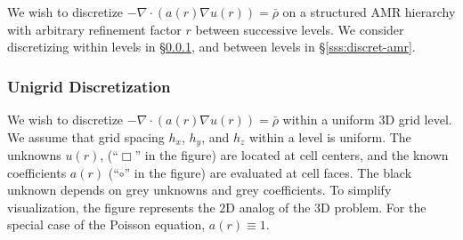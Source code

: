 \documentclass[10pt]{article}
\begin{document}
\newcommand{\indvar}{r}
 \newcommand{\uc}{u(\indvar)}

 \newcommand{\uxp}{u(\indvar+h_x)}
 \newcommand{\uxm}{u(\indvar-h_x)}
 \newcommand{\uxph}{u(\indvar+\frac{h_x}{2})}
 \newcommand{\uxmh}{u(\indvar-\frac{h_x}{2})}

 \newcommand{\uyp}{u(\indvar+h_y)}
 \newcommand{\uym}{u(\indvar-h_y)}
 \newcommand{\uyph}{u(\indvar+\frac{h_y}{2})}
 \newcommand{\uymh}{u(\indvar-\frac{h_y}{2})}

 \newcommand{\uzp}{u(\indvar+h_z)}
 \newcommand{\uzm}{u(\indvar-h_z)}
 \newcommand{\uzph}{u(\indvar+\frac{h_z}{2})}
 \newcommand{\uzmh}{u(\indvar-\frac{h_z}{2})}

 \newcommand{\ac}{a(\indvar)}
 \newcommand{\axph}{a(\indvar+\frac{h_x}{2})}
 \newcommand{\axmh}{a(\indvar-\frac{h_x}{2})}
 \newcommand{\ayph}{a(\indvar+\frac{h_y}{2})}
 \newcommand{\aymh}{a(\indvar-\frac{h_y}{2})}
 \newcommand{\azph}{a(\indvar+\frac{h_z}{2})}
 \newcommand{\azmh}{a(\indvar-\frac{h_z}{2})}

 \newcommand{\alc}{\alpha_{0}}
 \newcommand{\alxp}{\alpha_{x}}
 \newcommand{\alxm}{\alpha_{\bar{x}}}
 \newcommand{\alyp}{\alpha_{y}}
 \newcommand{\alym}{\alpha_{\bar{y}}}
 \newcommand{\alzp}{\alpha_{z}}
 \newcommand{\alzm}{\alpha_{\bar{z}}}

 \newcommand{\Uc}{U_{0}}
 \newcommand{\Uxp}{U_{x}}
 \newcommand{\Uxm}{U_{\bar{x}}}
 \newcommand{\Uyp}{U_{y}}
 \newcommand{\Uym}{U_{\bar{y}}}
 \newcommand{\Uzp}{U_{z}}
 \newcommand{\Uzm}{U_{\bar{z}}}

We wish to discretize $- \nabla\cdot(\ac \nabla \uc) = \bar{\rho}$
on a structured AMR hierarchy with arbitrary refinement factor $r$
between successive levels.  We consider discretizing within levels in
\S\ref{sss:discret-unigrid}, and between
levels in \S\ref{sss:discret-amr}.

\subsubsection{Unigrid Discretization} \label{sss:discret-unigrid}

We wish to discretize $- \nabla\cdot(\ac \nabla \uc) = \bar{\rho}$
within a uniform $3$D grid level.  We assume that grid spacing
$h_{x}$, $h_{y}$, and $h_{z}$ within a level is uniform.  The unknowns
$u(r)$, (``$\Box$'' in the figure) are located at cell centers, and
the known coefficients $a(r)$ (``$\circ$'' in the figure) are
evaluated at cell faces.  The black unknown depends on grey unknowns
and grey coefficients.  To simplify visualization, the figure
represents the $2$D analog of the $3$D problem.  For the special case
of the Poisson equation, $a(r)\equiv 1$.
\end{document}
